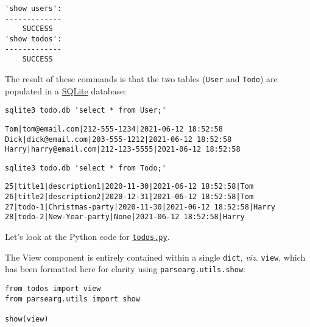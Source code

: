 \documentclass[10pt]{amsart}
\numberwithin{equation}{section}
\begin{document}
\begin{verbatim}
'show users':
-------------
	SUCCESS
'show todos':
-------------
	SUCCESS
\end{verbatim}


The result of these commands is that the two tables (\texttt{User} and \texttt{Todo})
are populated in a \href{https://www.sqlite.org/index.html}{SQLite} database:
\begin{verbatim}
sqlite3 todo.db 'select * from User;'
\end{verbatim}

\begin{verbatim}
Tom|tom@email.com|212-555-1234|2021-06-12 18:52:58
Dick|dick@email.com|203-555-1212|2021-06-12 18:52:58
Harry|harry@email.com|212-123-5555|2021-06-12 18:52:58
\end{verbatim}


\begin{verbatim}
sqlite3 todo.db 'select * from Todo;'
\end{verbatim}

\begin{verbatim}
25|title1|description1|2020-11-30|2021-06-12 18:52:58|Tom
26|title2|description2|2020-12-31|2021-06-12 18:52:58|Tom
27|todo-1|Christmas-party|2020-11-30|2021-06-12 18:52:58|Harry
28|todo-2|New-Year-party|None|2021-06-12 18:52:58|Harry
\end{verbatim}


Let's look at the Python code for \href{https://github.com/tharte/parsearg/blob/master/doc/examples/todos.py}{\texttt{todos.py}}.

The View component is entirely contained within a single \texttt{dict}, \emph{viz.} 
\texttt{view}, which has been formatted here for clarity using \texttt{parsearg.utils.show}:
\begin{verbatim}
from todos import view
from parsearg.utils import show

show(view)
\end{verbatim}
\end{document}

